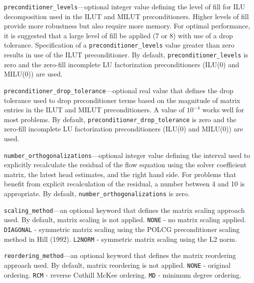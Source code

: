 \item \texttt{preconditioner\_levels}---optional integer value defining the level of fill for ILU decomposition used in the ILUT and MILUT preconditioners. Higher levels of fill provide more robustness but also require more memory. For optimal performance, it is suggested that a large level of fill be applied (7 or 8) with use of a drop tolerance. Specification of a \texttt{preconditioner\_levels} value greater than zero results in use of the ILUT preconditioner. By default, \texttt{preconditioner\_levels} is zero and the zero-fill incomplete LU factorization preconditioners (ILU(0) and MILU(0)) are used.

\item \texttt{preconditioner\_drop\_tolerance}---optional real value that defines the drop tolerance used to drop preconditioner terms based on the magnitude of matrix entries in the ILUT and MILUT preconditioners. A value of $10^{-4}$ works well for most problems. By default, \texttt{preconditioner\_drop\_tolerance} is zero and the zero-fill incomplete LU factorization preconditioners (ILU(0) and MILU(0)) are used.

\item \texttt{number\_orthogonalizations}---optional integer value defining the interval used to explicitly recalculate the residual of the flow equation using the solver coefficient matrix, the latest head estimates, and the right hand side. For problems that benefit from explicit recalculation of the residual, a number between 4 and 10 is appropriate. By default, \texttt{number\_orthogonalizations} is zero.

\item \texttt{scaling\_method}---an optional keyword that defines the matrix scaling approach used. By default, matrix scaling is not applied.  \texttt{NONE} - no matrix scaling applied.  \texttt{DIAGONAL} - symmetric matrix scaling using the POLCG preconditioner scaling method in Hill (1992).  \texttt{L2NORM} - symmetric matrix scaling using the L2 norm.

\item \texttt{reordering\_method}---an optional keyword that defines the matrix reordering approach used. By default, matrix reordering is not applied.  \texttt{NONE} - original ordering.  \texttt{RCM} - reverse Cuthill McKee ordering.  \texttt{MD} - minimum degree ordering.


